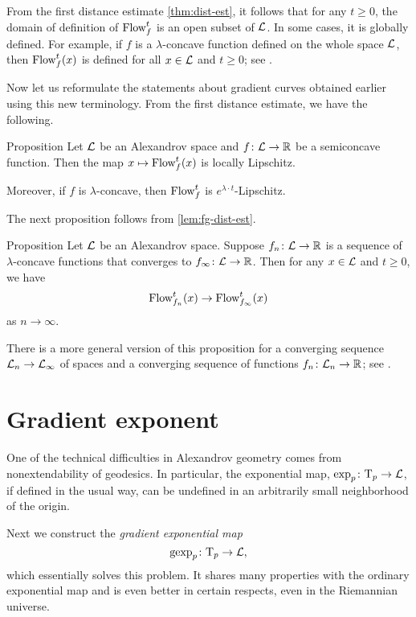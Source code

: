 From the first distance estimate \ref{thm:dist-est}, 
it follows that for any $t\ge 0$, the domain of definition of $\mathop{\rm Flow}\nolimits^t_f$ is an open subset of $\mathcal{L}$.
In some cases, it is globally defined.
For example, if $f$ is a $\lambda$-concave function defined on the whole space $\mathcal{L}$, then $\mathop{\rm Flow}\nolimits^t_f(x)$ is defined for all $x\in \mathcal{L}$ and $t\ge0$;
see \cite[16.19]{alexander-kapovitch-petrunin2024}.

Now let us reformulate the statements about gradient curves obtained earlier using this new terminology.
From the first distance estimate, we have the following.

\begin{thm}{Proposition}\label{prop:GF-is-lip}
Let $\mathcal{L}$ be an Alexandrov space 
and $f\colon\mathcal{L}\to \mathbb{R}$ be a semiconcave function.
Then the map $x\mapsto\mathop{\rm Flow}\nolimits^t_f(x)$ is locally Lipschitz.

Moreover, if $f$ is $\lambda$-concave, then $\mathop{\rm Flow}\nolimits^t_f$ is $e^{\lambda\cdot t}$-Lipschitz.
\end{thm}

The next proposition follows from \ref{lem:fg-dist-est}.

\begin{thm}{Proposition}\label{grad-curve-conv}
Let $\mathcal{L}$ be an Alexandrov space.
Suppose $f_n\colon\mathcal{L}\to\mathbb{R}$ is a sequence of
$\lambda$-concave functions 
that converges to $f_\infty\colon\mathcal{L}\to \mathbb{R}$. 
Then for any $x\in \mathcal{L}$ and $t\ge 0$, we have
\[\mathop{\rm Flow}\nolimits_{f_n}^t(x)\to \mathop{\rm Flow}\nolimits_{f_\infty}^t(x)\]
as $n\to \infty$.
\end{thm}

There is a more general version of this proposition for a converging sequence $\mathcal{L}_n\to \mathcal{L}_\infty$ of spaces and a converging sequence of functions $f_n\colon\mathcal{L}_n\to\mathbb{R}$; see \cite[16.21]{alexander-kapovitch-petrunin2024}.

\section{Gradient exponent}\label{gexp}

One of the technical difficulties in Alexandrov geometry comes from
nonextendability of geodesics. 
In particular, the exponential map, $\exp_p\colon\mathrm{T}_p\to \mathcal{L}$, if defined in the usual way, can
be undefined in an arbitrarily small neighborhood of the origin. 

Next we construct the \emph{gradient exponential map} 
\[\operatorname{\rm gexp}\nolimits_p\colon\mathrm{T}_p\to\mathcal{L},\]
which essentially solves this problem. 
It shares many properties with the ordinary exponential map and is even better in certain respects,
even in the Riemannian universe.

